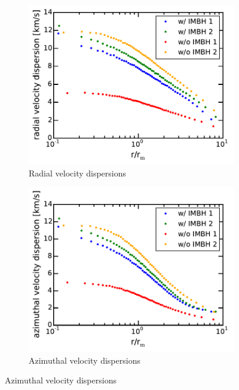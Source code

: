 \begin{figure}[htbp]
	\centering
	\begin{subfigure}{0.475\textwidth}
		\centering
		\includegraphics[width=\textwidth]{Plots/radial_velocity_dispersion.pdf}
		\caption{Radial velocity dispersions}
		\label{[fig:radial_vel_disp]}
	\end{subfigure}
	\hfill
	\begin{subfigure}{0.475\textwidth}
		\centering
		\includegraphics[width=\textwidth]{Plots/azimuthal_velocity_dispersion.pdf}
		\caption{Azimuthal velocity dispersions}
		\label{[fig:azimuthal_vel_disp]}
	\end{subfigure}

\end{figure}
